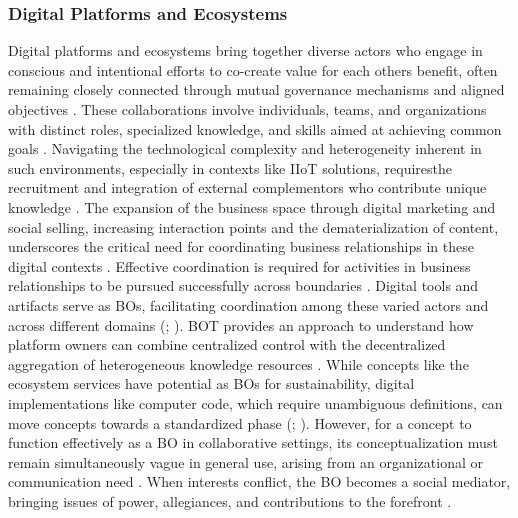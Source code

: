 \documentclass[12pt,oneside]{article}
\begin{document}
\subsubsection{Digital Platforms and Ecosystems} \label{digital-platforms}

Digital platforms and ecosystems bring together diverse actors who engage in conscious and intentional efforts to co-create value for each others benefit, often remaining closely connected through mutual governance mechanisms and aligned objectives \citep[309]{elo2024enabling}. These collaborations involve individuals, teams, and organizations with distinct roles, specialized knowledge, and skills aimed at achieving common goals \citep[309]{elo2024enabling}. Navigating the technological complexity and heterogeneity inherent in such environments, especially in contexts like \ac{IIoT} solutions, requiresthe recruitment and integration of external complementors who contribute unique knowledge \citep[1]{petrik2021exploring}. The expansion of the business space through digital marketing and social selling, increasing interaction points and the dematerialization of content, underscores the critical need for coordinating business relationships in these digital contexts \citep[228]{corsaro2018crossing}. Effective coordination is required for activities in business relationships to be pursued successfully across boundaries \citep[221]{corsaro2018crossing}. Digital tools and artifacts serve as \ac{BO}s, facilitating coordination among these varied actors and across different domains (\citealp[4]{ghazawneh2010governing}; \citealp[219-220]{corsaro2018crossing}). \ac{BOT} provides an approach to understand how platform owners can combine centralized control with the decentralized aggregation of heterogeneous knowledge resources \citep[4]{ghazawneh2010governing}. \newline
While concepts like the ecosystem services have potential as \ac{BO}s for sustainability, digital implementations like computer code, which require unambiguous definitions, can move concepts towards a standardized phase (\citealp[30, 36]{abson2014ecosystem}; \citealp[158]{steger2018ecosystem}). However, for a concept to function effectively as a \ac{BO} in collaborative settings, its conceptualization must remain simultaneously vague in general use, arising from an organizational or communication need \citep[158]{steger2018ecosystem}. When interests conflict, the \ac{BO} becomes a social mediator, bringing issues of power, allegiances, and contributions to the forefront \citep[220]{corsaro2018crossing}. \newline
\end{document}

